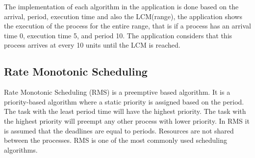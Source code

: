 \documentclass[12pt, conference]{IEEEtran}
\begin{document}
The implementation of each algorithm in the application is done based on the arrival, period, execution time and also the LCM(range), the application shows the execution of the process for the entire range, that is if a process has an arrival time 0, execution time 5, and period 10. The application considers that this process arrives at every 10 units until the LCM is reached. 

\subsection{Rate Monotonic Scheduling}
Rate Monotonic Scheduling (RMS) is a preemptive based algorithm. It is a priority-based algorithm where a static priority is assigned based on the period. The task with the least period time will have the highest priority. The task with the highest priority will preempt any other process with lower priority. In RMS it is assumed that the deadlines are equal to periods. Resources are not shared between the processes. RMS is one of the most commonly used scheduling algorithms.
\end{document}
